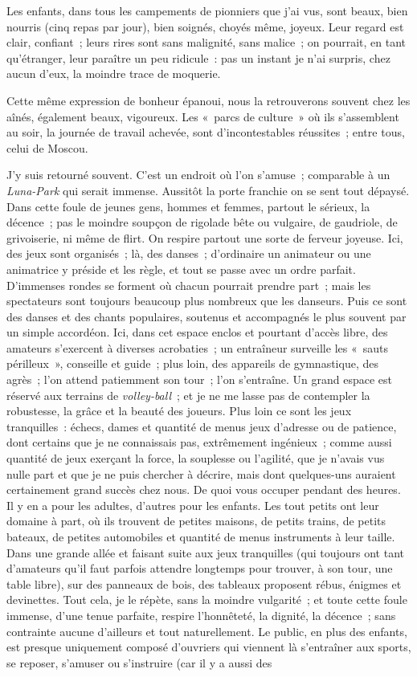 \documentclass[twoside]{book} %
\newcommand{\astermono}{\medskip\centerline{\color{rubric}\large\selectfont{\syms ✻}}\medskip\par}%
\begin{document}
\astermono

\noindent Les enfants, dans tous les campements de pionniers que j’ai vus, sont beaux, bien nourris (cinq repas par jour), bien soignés, choyés même, joyeux. Leur regard est clair, confiant ; leurs rires sont sans malignité, sans malice ; on pourrait, en tant qu’étranger, leur paraître un peu ridicule : pas un instant je n’ai surpris, chez aucun d’eux, la moindre trace de moquerie.\par
Cette même expression de bonheur épanoui, nous la retrouverons souvent chez les aînés, également beaux, vigoureux. Les « parcs de culture » où ils s’assemblent au soir, la journée de travail achevée, sont d’incontestables réussites ; entre tous, celui de Moscou.\par
J’y suis retourné souvent. C’est un endroit où l’on s’amuse ; comparable à un \emph{Luna-Park} qui serait immense. Aussitôt la porte franchie on se sent tout dépaysé. Dans cette foule de jeunes gens, hommes et femmes, partout le sérieux, la décence ; pas le moindre soupçon de rigolade bête ou vulgaire, de gaudriole, de grivoiserie, ni même de flirt. On respire partout une sorte de ferveur joyeuse. Ici, des jeux sont organisés ; là, des danses ; d’ordinaire un animateur ou une animatrice y préside et les règle, et tout se passe avec un ordre parfait. D’immenses rondes se forment où chacun pourrait prendre part ; mais les spectateurs sont toujours beaucoup plus nombreux que les danseurs. Puis ce sont des danses et des chants populaires, soutenus et accompagnés le plus souvent par un simple accordéon. Ici, dans cet espace enclos et pourtant d’accès libre, des amateurs s’exercent à diverses acrobaties ; un entraîneur surveille les « sauts périlleux », conseille et guide ; plus loin, des appareils de gymnastique, des agrès ; l’on attend patiemment son tour ; l’on s’entraîne. Un grand espace est réservé aux terrains de \emph{volley-ball} ; et je ne me lasse pas de contempler la robustesse, la grâce et la beauté des joueurs. Plus loin ce sont les jeux tranquilles : échecs, dames et quantité de menus jeux d’adresse ou de patience, dont certains que je ne connaissais pas, extrêmement ingénieux ; comme aussi quantité de jeux exerçant la force, la souplesse ou l’agilité, que je n’avais vus nulle part et que je ne puis chercher à décrire, mais dont quelques-uns auraient certainement grand succès chez nous. De quoi vous occuper pendant des heures. Il y en a pour les adultes, d’autres pour les enfants. Les tout petits ont leur domaine à part, où ils trouvent de petites maisons, de petits trains, de petits bateaux, de petites automobiles et quantité de menus instruments à leur taille. Dans une grande allée et faisant suite aux jeux tranquilles (qui toujours ont tant d’amateurs qu’il faut parfois attendre longtemps pour trouver, à son tour, une table libre), sur des panneaux de bois, des tableaux proposent rébus, énigmes et devinettes. Tout cela, je le répète, sans la moindre vulgarité ; et toute cette foule immense, d’une tenue parfaite, respire l’honnêteté, la dignité, la décence ; sans contrainte aucune d’ailleurs et tout naturellement. Le public, en plus des enfants, est presque uniquement composé d’ouvriers qui viennent là s’entraîner aux sports, se reposer, s’amuser ou s’instruire (car il y a aussi des 
\end{document}
